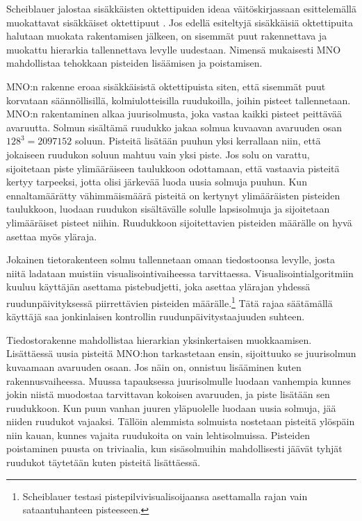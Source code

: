 Scheiblauer jalostaa sisäkkäisten oktettipuiden ideaa väitöskirjassaan esittelemällä muokattavat sisäkkäiset oktettipuut . Jos edellä esiteltyjä sisäkkäisiä oktettipuita halutaan muokata rakentamisen jälkeen, on sisemmät puut rakennettava ja muokattu hierarkia tallennettava levylle uudestaan. Nimensä mukaisesti MNO mahdollistaa tehokkaan pisteiden lisäämisen ja poistamisen. \cite{scheiblauer}  

MNO:n rakenne eroaa sisäkkäisistä oktettipuista siten, että sisemmät puut korvataan säännöllisillä, kolmiulotteisilla ruudukoilla, joihin pisteet tallennetaan. MNO:n rakentaminen alkaa juurisolmusta, joka vastaa kaikki pisteet peittävää avaruutta. Solmun sisältämä ruudukko jakaa solmua kuvaavan avaruuden osan $128^3 = 2 097 152$ soluun. Pisteitä lisätään puuhun yksi kerrallaan niin, että jokaiseen ruudukon soluun mahtuu vain yksi piste. Jos solu on varattu, sijoitetaan piste ylimääräiseen taulukkoon odottamaan, että vastaavia pisteitä kertyy tarpeeksi, jotta olisi järkevää luoda uusia solmuja puuhun. Kun ennaltamäärätty vähimmäismäärä pisteitä on kertynyt ylimääräisten pisteiden taulukkoon, luodaan ruudukon sisältävälle solulle lapsisolmuja ja sijoitetaan ylimääräiset pisteet niihin. Ruudukkoon sijoitettavien pisteiden määrälle on hyvä asettaa myös yläraja. \cite{scheiblauer}

Jokainen tietorakenteen solmu tallennetaan omaan tiedostoonsa levylle, josta niitä ladataan muistiin visualisointivaiheessa tarvittaessa. Visualisointialgoritmiin kuuluu käyttäjän asettama pistebudjetti, joka asettaa ylärajan yhdessä ruudunpäivityksessä piirrettävien pisteiden määrälle.\footnote{Scheiblauer testasi pistepilvivisualisoijaansa asettamalla rajan vain sataantuhanteen pisteeseen.} Tätä rajaa säätämällä käyttäjä saa jonkinlaisen kontrollin ruudunpäivitystaajuuden suhteen. \cite{scheiblauer}

Tiedostorakenne mahdollistaa hierarkian yksinkertaisen muokkaamisen. Lisättäessä uusia pisteitä MNO:hon tarkastetaan ensin, sijoittuuko se juurisolmun kuvaamaan avaruuden osaan. Jos näin on, onnistuu lisääminen kuten rakennusvaiheessa. Muussa tapauksessa juurisolmulle luodaan vanhempia kunnes jokin niistä muodostaa tarvittavan kokoisen avaruuden, ja piste lisätään sen ruudukkoon. Kun puun vanhan juuren yläpuolelle luodaan uusia solmuja, jää niiden ruudukot vajaaksi. Tällöin alemmista solmuista nostetaan pisteitä ylöspäin niin kauan, kunnes vajaita ruudukoita on vain lehtisolmuissa. Pisteiden poistaminen puusta on triviaalia, kun sisäsolmuihin mahdollisesti jäävät tyhjät ruudukot täytetään kuten pisteitä lisättäessä. \cite{scheiblauer}



